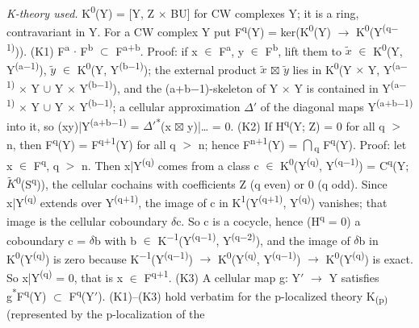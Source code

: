 \emph{K-theory used.} K\textsuperscript{0}(Y) = [Y, Z \ensuremath{\times} BU] for CW complexes Y; it is a ring, contravariant in Y. For a CW complex Y put F\textsuperscript{q}(Y) = ker(K\textsuperscript{0}(Y) \ensuremath{\to} K\textsuperscript{0}(Y\textsuperscript{(q\ensuremath{-}1)})). (K1) F\textsuperscript{a} \ensuremath{\cdot} F\textsuperscript{b} \ensuremath{\subset} F\textsuperscript{a+b}. Proof: if x \ensuremath{\in} F\textsuperscript{a}, y \ensuremath{\in} F\textsuperscript{b}, lift them to \ensuremath{\widetilde{x}} \ensuremath{\in} K\textsuperscript{0}(Y, Y\textsuperscript{(a\ensuremath{-}1)}), \ensuremath{\widetilde y} \ensuremath{\in} K\textsuperscript{0}(Y, Y\textsuperscript{(b\ensuremath{-}1)}); the external product \ensuremath{\widetilde{x}} \ensuremath{\boxtimes} \ensuremath{\widetilde y} lies in K\textsuperscript{0}(Y \ensuremath{\times} Y, Y\textsuperscript{(a\ensuremath{-}1)} \ensuremath{\times} Y \ensuremath{\cup} Y \ensuremath{\times} Y\textsuperscript{(b\ensuremath{-}1)}), and the (a+b\ensuremath{-}1)-skeleton of Y \ensuremath{\times} Y is contained in Y\textsuperscript{(a\ensuremath{-}1)} \ensuremath{\times} Y \ensuremath{\cup} Y \ensuremath{\times} Y\textsuperscript{(b\ensuremath{-}1)}; a cellular approximation \ensuremath{\Delta}\ensuremath{\prime} of the diagonal maps Y\textsuperscript{(a+b\ensuremath{-}1)} into it, so (xy)|Y\textsuperscript{(a+b\ensuremath{-}1)} = \ensuremath{\Delta}\ensuremath{\prime}\textsuperscript{*}(x \ensuremath{\boxtimes} y)|\ldots{} = 0. (K2) If H\textsuperscript{q}(Y; Z) = 0 for all q \ensuremath{>} n, then F\textsuperscript{q}(Y) = F\textsuperscript{q+1}(Y) for all q \ensuremath{>} n; hence F\textsuperscript{n+1}(Y) = \ensuremath{\bigcap}\textsubscript{q} F\textsuperscript{q}(Y). Proof: let x \ensuremath{\in} F\textsuperscript{q}, q \ensuremath{>} n. Then x|Y\textsuperscript{(q)} comes from a class c \ensuremath{\in} K\textsuperscript{0}(Y\textsuperscript{(q)}, Y\textsuperscript{(q\ensuremath{-}1)}) = C\textsuperscript{q}(Y; \ensuremath{\widetilde{K}}\textsuperscript{0}(S\textsuperscript{q})), the cellular cochains with coefficients Z (q even) or 0 (q odd). Since x|Y\textsuperscript{(q)} extends over Y\textsuperscript{(q+1)}, the image of c in K\textsuperscript{1}(Y\textsuperscript{(q+1)}, Y\textsuperscript{(q)}) vanishes; that image is the cellular coboundary \ensuremath{\delta}c. So c is a cocycle, hence (H\textsuperscript{q} = 0) a coboundary c = \ensuremath{\delta}b with b \ensuremath{\in} K\textsuperscript{\ensuremath{-}1}(Y\textsuperscript{(q\ensuremath{-}1)}, Y\textsuperscript{(q\ensuremath{-}2)}), and the image of \ensuremath{\delta}b in K\textsuperscript{0}(Y\textsuperscript{(q)}) is zero because K\textsuperscript{\ensuremath{-}1}(Y\textsuperscript{(q\ensuremath{-}1)}) \ensuremath{\to} K\textsuperscript{0}(Y\textsuperscript{(q)}, Y\textsuperscript{(q\ensuremath{-}1)}) \ensuremath{\to} K\textsuperscript{0}(Y\textsuperscript{(q)}) is exact. So x|Y\textsuperscript{(q)} = 0, that is x \ensuremath{\in} F\textsuperscript{q+1}. (K3) A cellular map g: Y\ensuremath{\prime} \ensuremath{\to} Y satisfies g\textsuperscript{*}F\textsuperscript{q}(Y) \ensuremath{\subset} F\textsuperscript{q}(Y\ensuremath{\prime}). (K1)--(K3) hold verbatim for the p-localized theory K\textsubscript{(p)} (represented by the p-localization of the 
